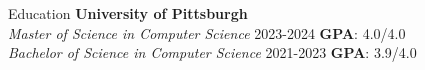 \begin{rSection}{Education}
    {\bf University of Pittsburgh}\\
    \textit{Master of Science in Computer Science}
    \hfill
    {2023-2024}
    \textbf{GPA}: 4.0/4.0
    \\
    \textit{Bachelor of Science in Computer Science}
    \hfill
    {2021-2023}
    \textbf{GPA}: 3.9/4.0
    \\
    
\end{rSection}

